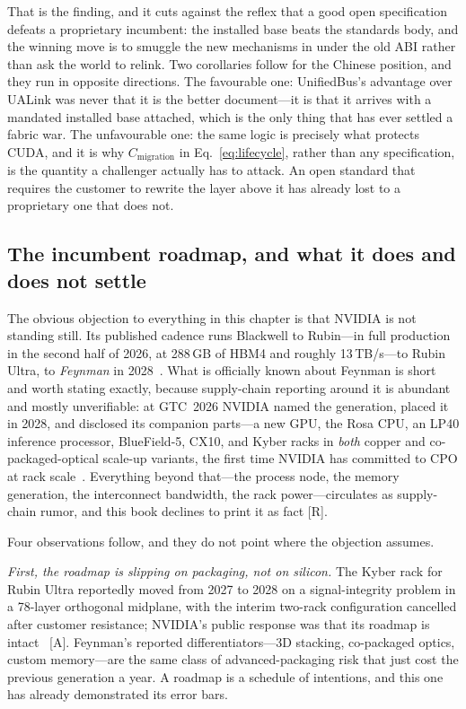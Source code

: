 That is the finding, and it cuts against the reflex that a good open specification defeats a proprietary incumbent: the installed base beats the standards body, and the winning move is to smuggle the new mechanisms in under the old ABI rather than ask the world to relink. Two corollaries follow for the Chinese position, and they run in opposite directions. The favourable one: UnifiedBus's advantage over UALink was never that it is the better document---it is that it arrives with a mandated installed base attached, which is the only thing that has ever settled a fabric war. The unfavourable one: the same logic is precisely what protects CUDA, and it is why $C_{\mathrm{migration}}$ in Eq.~\eqref{eq:lifecycle}, rather than any specification, is the quantity a challenger actually has to attack. An open standard that requires the customer to rewrite the layer above it has already lost to a proprietary one that does not.

\subsection{The incumbent roadmap, and what it does and does not settle}
\label{sec:feynman}

The obvious objection to everything in this chapter is that NVIDIA is not standing still. Its published cadence runs Blackwell to Rubin---in full production in the second half of 2026, at 288\,GB of HBM4 and roughly 13\,TB/s---to Rubin Ultra, to \emph{Feynman} in 2028~\cite{nvidia-rubin-pod}. What is officially known about Feynman is short and worth stating exactly, because supply-chain reporting around it is abundant and mostly unverifiable: at GTC~2026 NVIDIA named the generation, placed it in 2028, and disclosed its companion parts---a new GPU, the Rosa CPU, an LP40 inference processor, BlueField-5, CX10, and Kyber racks in \emph{both} copper and co-packaged-optical scale-up variants, the first time NVIDIA has committed to CPO at rack scale~\cite{gtc2026-roadmap}. Everything beyond that---the process node, the memory generation, the interconnect bandwidth, the rack power---circulates as supply-chain rumor, and this book declines to print it as fact [R].

Four observations follow, and they do not point where the objection assumes.

\emph{First, the roadmap is slipping on packaging, not on silicon.} The Kyber rack for Rubin Ultra reportedly moved from 2027 to 2028 on a signal-integrity problem in a 78-layer orthogonal midplane, with the interim two-rack configuration cancelled after customer resistance; NVIDIA's public response was that its roadmap is intact~\cite{kyber-slip} [A]. Feynman's reported differentiators---3D stacking, co-packaged optics, custom memory---are the same class of advanced-packaging risk that just cost the previous generation a year. A roadmap is a schedule of intentions, and this one has already demonstrated its error bars.

